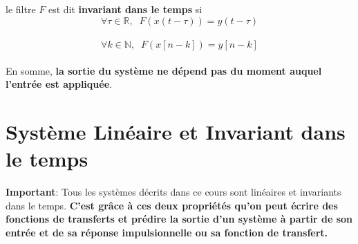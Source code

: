 \documentclass[11pt,a4paper]{article}
\begin{document}
le filtre $F$  est dit \textbf{invariant dans le temps} si \\

\[\forall \tau \in \mathbb{R}, \;\; \boxed{F(x(t-\tau)) = y(t-\tau)}\]\\

\[\forall k \in \mathbb{N}, \;\; \boxed{F(x[n-k]) = y[n-k]}\]\\

En somme, \textbf{la sortie du système ne dépend pas du moment auquel l'entrée est appliquée}.

\section{Système Linéaire et Invariant dans le temps}
\textbf{Important}: Tous les systèmes décrits dans ce cours sont linéaires et invariants dans le temps. \textbf{C'est grâce à ces deux propriétés qu'on peut écrire des fonctions de transferts et prédire la sortie d'un système à partir de son entrée et de sa réponse impulsionnelle ou sa fonction de transfert.}\\

\begin{center}
\end{center}
\end{document}
